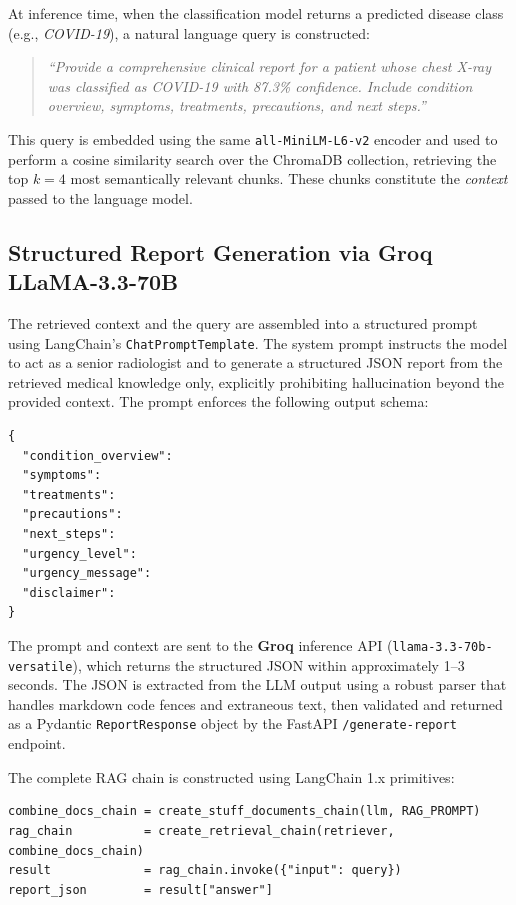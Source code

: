 \documentclass[12pt]{report}
\begin{document}
At inference time, when the classification model returns a predicted disease class (e.g., \textit{COVID-19}), a natural language query is constructed:

\begin{quote}
\textit{``Provide a comprehensive clinical report for a patient whose chest X-ray was classified as COVID-19 with 87.3\% confidence. Include condition overview, symptoms, treatments, precautions, and next steps.''}
\end{quote}

This query is embedded using the same \texttt{all-MiniLM-L6-v2} encoder and used to perform a cosine similarity search over the ChromaDB collection, retrieving the top $k=4$ most semantically relevant chunks. These chunks constitute the \textit{context} passed to the language model.

\subsection{Structured Report Generation via Groq LLaMA-3.3-70B}

The retrieved context and the query are assembled into a structured prompt using LangChain's \texttt{ChatPromptTemplate}. The system prompt instructs the model to act as a senior radiologist and to generate a structured JSON report from the retrieved medical knowledge only, explicitly prohibiting hallucination beyond the provided context. The prompt enforces the following output schema:

\begin{verbatim}
{
  "condition_overview": 
  "symptoms":          
  "treatments":         
  "precautions":      
  "next_steps":       
  "urgency_level":      
  "urgency_message":  
  "disclaimer":        
}
\end{verbatim}

The prompt and context are sent to the \textbf{Groq} inference API (\texttt{llama-3.3-70b-versatile}), which returns the structured JSON within approximately 1--3 seconds. The JSON is extracted from the LLM output using a robust parser that handles markdown code fences and extraneous text, then validated and returned as a Pydantic \texttt{ReportResponse} object by the FastAPI \texttt{/generate-report} endpoint.

The complete RAG chain is constructed using LangChain 1.x primitives:

\begin{verbatim}
combine_docs_chain = create_stuff_documents_chain(llm, RAG_PROMPT)
rag_chain          = create_retrieval_chain(retriever, combine_docs_chain)
result             = rag_chain.invoke({"input": query})
report_json        = result["answer"]
\end{verbatim}
\end{document}
